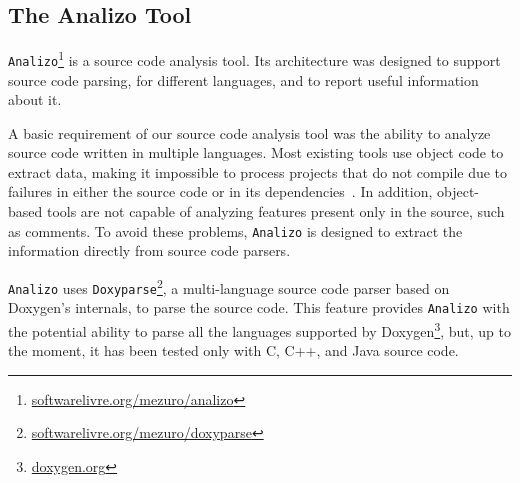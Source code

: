 \documentclass[conference]{IEEEtran}
\begin{document}


\subsection{The Analizo Tool}
\label{analizo}

\texttt{Analizo}\footnote{\url{softwarelivre.org/mezuro/analizo}} is a source code analysis tool. 
Its architecture was designed 
to support source code parsing, for different languages, and to
report useful information about it.

A basic requirement of our source code analysis tool was the ability to analyze
source code written in multiple languages.
%
Most existing tools use object code to extract data, making it impossible to process
projects that do not compile due to failures in either the source code or
in its dependencies~\cite{hassan05}.
In addition, object-based tools are not
capable of analyzing features present only in the source, such as comments.
%
To avoid these problems, \texttt{Analizo} is designed to extract the information
directly from source code parsers.

\texttt{Analizo} uses \texttt{Doxyparse}\footnote{\url{softwarelivre.org/mezuro/doxyparse}},
a multi-language source code parser based on Doxygen's internals,
to parse the source code.
%
This feature provides \texttt{Analizo} with the potential ability to parse all the languages supported
by Doxygen\footnote{\url{doxygen.org}},
but, up to the moment, it has been tested only with C, C++, and Java source code.
\end{document}
